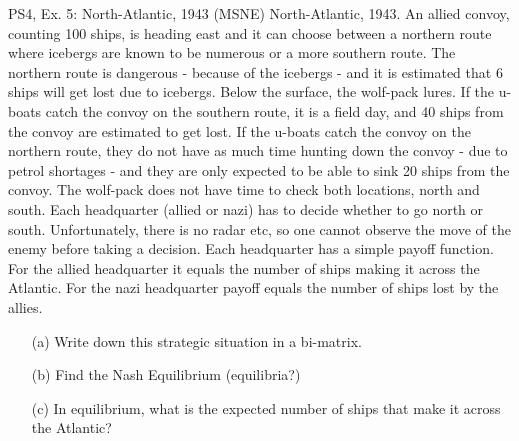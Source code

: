 \begin{frame}{PS4, Ex. 5: North-Atlantic, 1943 (MSNE)}
  North-Atlantic, 1943. An allied convoy, counting 100 ships, is heading east and it can choose between a northern route where icebergs are known to be numerous or a more southern route. The northern route is dangerous - because of the icebergs - and it is estimated that 6 ships will get lost due to icebergs. Below the surface, the wolf-pack lures. If the u-boats catch the convoy on the southern route, it is a field day, and 40 ships from the convoy are estimated to get lost. If the u-boats catch the convoy on the northern route, they do not have as much time hunting down the convoy - due to petrol shortages - and they are only expected to be able to sink 20 ships from the convoy. The wolf-pack does not have time to check both locations, north and south. Each headquarter (allied or nazi) has to decide whether to go north or south. Unfortunately, there is no radar etc, so one cannot observe the move of the enemy before taking a decision. Each headquarter has a simple payoff function. For the allied headquarter it equals the number of ships making it across the Atlantic. For the nazi headquarter payoff equals the number of ships lost by the allies.
  \begin{itemize}
    \item[(a)] Write down this strategic situation in a bi-matrix.
    \item[(b)] Find the Nash Equilibrium (equilibria?)
    \item[(c)] In equilibrium, what is the expected number of ships that make it across the Atlantic?
  \end{itemize}
\end{frame}
